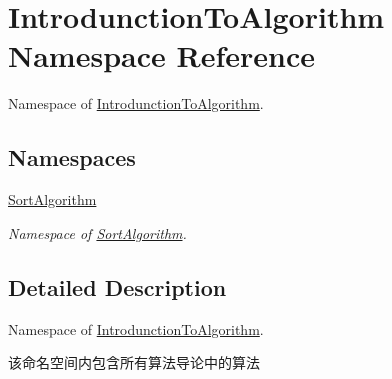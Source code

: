 \hypertarget{namespace_introdunction_to_algorithm}{}\section{Introdunction\+To\+Algorithm Namespace Reference}
\label{namespace_introdunction_to_algorithm}


Namespace of \hyperlink{namespace_introdunction_to_algorithm}{Introdunction\+To\+Algorithm}.  


\subsection*{Namespaces}
\begin{DoxyCompactItemize}
\item 
 \hyperlink{namespace_introdunction_to_algorithm_1_1_sort_algorithm}{Sort\+Algorithm}
\begin{DoxyCompactList}\small\item\em Namespace of \hyperlink{namespace_introdunction_to_algorithm_1_1_sort_algorithm}{Sort\+Algorithm}. \end{DoxyCompactList}\end{DoxyCompactItemize}


\subsection{Detailed Description}
Namespace of \hyperlink{namespace_introdunction_to_algorithm}{Introdunction\+To\+Algorithm}. 

该命名空间内包含所有算法导论中的算法 
